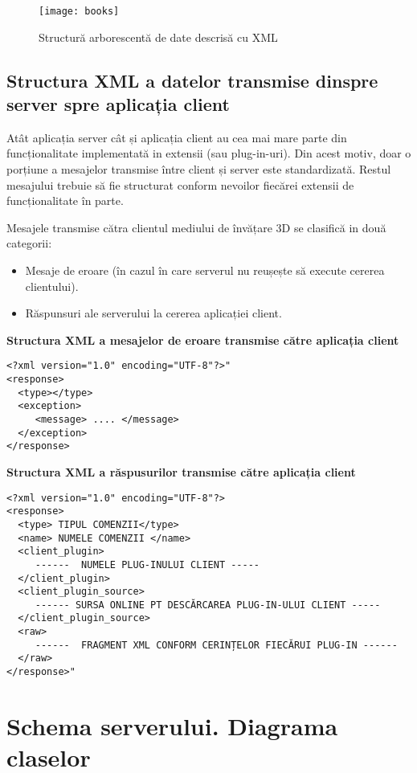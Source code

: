 \begin{figure}[h]
    \centering
    \texttt{[image: books]}
    \caption{Structură arborescentă de date descrisă cu XML}
    \label{fig:imag6}
\end{figure}

\subsection{Structura XML a datelor transmise dinspre server spre aplicația client}
\par Atât aplicația server cât și aplicația client au cea mai mare parte din funcționalitate implementată in extensii (sau plug-in-uri). Din acest motiv, doar o porțiune a mesajelor transmise între client și server este standardizată. Restul mesajului trebuie să fie structurat conform nevoilor fiecărei extensii de funcționalitate în parte.
\par Mesajele transmise cătra clientul mediului de învățare 3D se clasifică in două categorii:
\begin{itemize}
\item Mesaje de eroare (în cazul în care serverul nu reușește să execute cererea clientului).
\item Răspunsuri ale serverului la cererea aplicației client.
\end{itemize}
\textbf{Structura XML a mesajelor de eroare transmise către aplicația client}
\begin{verbatim}
<?xml version="1.0" encoding="UTF-8"?>"
<response>
  <type></type>
  <exception>
     <message> .... </message>
  </exception>
</response>
\end{verbatim}
\textbf{Structura XML a răspusurilor transmise către aplicația client}
\begin{verbatim}
<?xml version="1.0" encoding="UTF-8"?>
<response>
  <type> TIPUL COMENZII</type>
  <name> NUMELE COMENZII </name>  
  <client_plugin> 
     ------  NUMELE PLUG-INULUI CLIENT -----
  </client_plugin>
  <client_plugin_source> 
     ------ SURSA ONLINE PT DESCĂRCAREA PLUG-IN-ULUI CLIENT -----
  </client_plugin_source>
  <raw>
     ------  FRAGMENT XML CONFORM CERINȚELOR FIECĂRUI PLUG-IN ------
  </raw>
</response>"
\end{verbatim}

\section{Schema serverului. Diagrama claselor }
